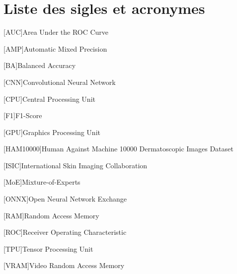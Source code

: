 \chapter*{Liste des sigles et acronymes}
\begin{acronym}[HAM10000]

[AUC]{Area Under the ROC Curve}
\medskip

[AMP]{Automatic Mixed Precision}
\medskip

[BA]{Balanced Accuracy}
\medskip

[CNN]{Convolutional Neural Network}
\medskip

[CPU]{Central Processing Unit}
\medskip

[F1]{F1-Score}
\medskip

[GPU]{Graphics Processing Unit}
\medskip

[HAM10000]{Human Against Machine 10000 Dermatoscopic Images Dataset}
\medskip

[ISIC]{International Skin Imaging Collaboration}
\medskip

[MoE]{Mixture-of-Experts}
\medskip

[ONNX]{Open Neural Network Exchange}
\medskip

[RAM]{Random Access Memory}
\medskip

[ROC]{Receiver Operating Characteristic}
\medskip

[TPU]{Tensor Processing Unit}
\medskip

[VRAM]{Video Random Access Memory}
\medskip

\end{acronym}
